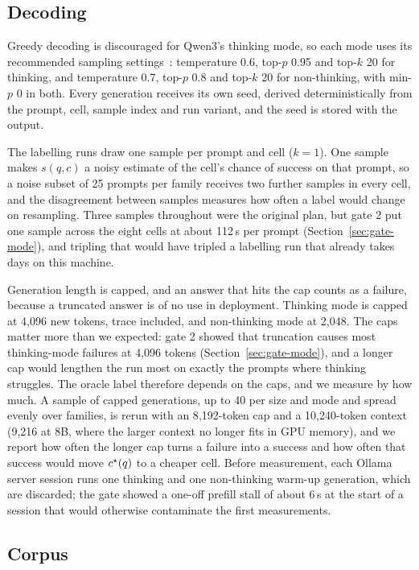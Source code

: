 \subsection{Decoding}
\label{sec:decoding}

Greedy decoding is discouraged for Qwen3's thinking mode, so each mode uses
its recommended sampling settings~\cite{qwen2025modelcard}: temperature 0.6, top-$p$ 0.95 and top-$k$
20 for thinking, and temperature 0.7, top-$p$ 0.8 and top-$k$ 20 for
non-thinking, with min-$p$ 0 in both. Every generation receives its own seed,
derived deterministically from the prompt, cell, sample index and run
variant, and the seed is stored with the output.

The labelling runs draw one sample per prompt and cell ($k = 1$). One sample
makes $s(q, c)$ a noisy estimate of the cell's chance of success on that
prompt, so a noise subset of 25 prompts per family receives two further
samples in every cell, and the disagreement between samples measures how
often a label would change on resampling. Three samples throughout were the
original plan, but gate 2 put one sample across the eight cells at about
112\,s per prompt (Section~\ref{sec:gate-mode}), and tripling that would have
tripled a labelling run that already takes days on this machine.

Generation length is capped, and an answer that hits the cap counts as a
failure, because a truncated answer is of no use in deployment. Thinking
mode is capped at 4{,}096 new tokens, trace included, and non-thinking mode
at 2{,}048. The caps matter more than we expected: gate 2 showed that
truncation causes most thinking-mode failures at 4{,}096 tokens
(Section~\ref{sec:gate-mode}), and a longer cap would lengthen the run most on
exactly the prompts where thinking struggles. The oracle label therefore
depends on the caps, and we measure by how much. A sample of capped
generations, up to 40 per size and mode and spread evenly over families, is
rerun with an 8{,}192-token cap and a 10{,}240-token context (9{,}216 at 8B,
where the larger context no longer fits in GPU memory), and we report
how often the longer cap turns a failure into a success and how often that
success would move $c^{\star}(q)$ to a cheaper cell. Before measurement, each
Ollama server session
runs one thinking and one non-thinking warm-up generation, which are
discarded; the gate showed a one-off prefill stall of about 6\,s at the
start of a session that would otherwise contaminate the first measurements.

\subsection{Corpus}
\label{sec:corpus}


